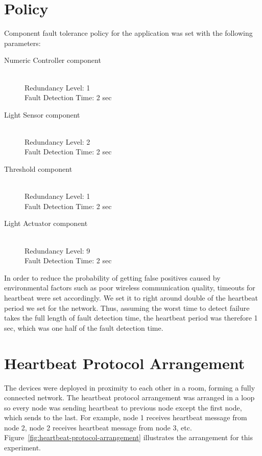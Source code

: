 \section{Policy}

Component fault tolerance policy for the application was set with the
following parameters:

\begin{description}
  \item[Numeric Controller component] \hfill \\
    Redundancy Level: 1\\
    Fault Detection Time: 2 sec\\
  \item[Light Sensor component] \hfill \\
    Redundancy Level: 2\\
    Fault Detection Time: 2 sec\\
  \item[Threshold component] \hfill \\
    Redundancy Level: 1\\
    Fault Detection Time: 2 sec\\
  \item[Light Actuator component] \hfill \\
    Redundancy Level: 9\\
    Fault Detection Time: 2 sec\\
\end{description}

In order to reduce the probability of getting false positives caused by
environmental factors such as poor wireless communication quality, timeouts for
heartbeat were set accordingly.  We set it to right around double of the
heartbeat period we set for the network.  Thus, assuming the worst time to
detect failure takes the full length of fault detection time, the heartbeat
period was therefore 1 sec, which was one half of the fault detection time.

\section{Heartbeat Protocol Arrangement}

The devices were deployed in proximity to each other in a room, forming a fully
connected network.
The heartbeat protocol arrangement was arranged in a loop so every node was
sending heartbeat to previous node except the first node, which sends to the
last. For example, node 1 receives heartbeat message from node 2, node
2 receives heartbeat message from node 3, etc.
Figure~\ref{fig:heartbeat-protocol-arrangement} illustrates the arrangement for
this experiment.

